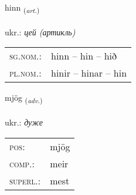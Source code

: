 \documentclass[frontgrid, backgrid]{flacards}\usepackage[]{graphicx}\usepackage[]{xcolor}
\begin{document}
\renewcommand{\blhead}{\vskip5pt {\small\bfseries\footnotesize Greinir | артикль }}
\renewcommand{\bcfoot}{\vskip5pt \hspace{2pt}{\small\bfseries\footnotesize 1K}}


{hinn \small{\textsubscript{(\textit{art.})}} \\[1ex] %
\textphonetic{[hɪn]} \\
ukr.: \emph{цей (артикль)} \\  [2ex]
\renewcommand*{\arraystretch}{0.8}
\begin{tabular}{ll}
\textsc{sg.nom.}: & hinn  --  hin -- hið \\ 
\textsc{pl.nom.}: & hinir -- hinar -- hin
\end{tabular}
}

\renewcommand{\flhead}{\vskip5pt \fboxsep=0pt {\small\bfseries\footnotesize Atviksorð | прислівник}}
\renewcommand{\fcfoot}{\vskip5pt \fboxsep=0pt \hspace{2pt}{\small\bfseries\footnotesize 1K}}

\renewcommand{\blhead}{\vskip5pt {\small\bfseries\footnotesize Atviksorð | прислівник }}
\renewcommand{\bcfoot}{\vskip5pt \hspace{2pt}{\small\bfseries\footnotesize 1K}}


{mjög \small{\textsubscript{(\textit{adv.})}} \\[1ex] %
\textphonetic{[mjœːɣ]} \\
ukr.: \emph{дуже} \\  [2ex]
\renewcommand*{\arraystretch}{0.8}
\begin{tabular}{ll}
\textsc{pos}: & mjög \\ 
\textsc{comp.}: & meir \\ 
\textsc{superl.}: & mest \\
\end{tabular}
}

\renewcommand{\flhead}{\vskip5pt \fboxsep=0pt {\small\bfseries\footnotesize Sagnorð | дієслово}}
\renewcommand{\fcfoot}{\vskip5pt \fboxsep=0pt \hspace{2pt}{\small\bfseries\footnotesize 1K}}
\end{document}
